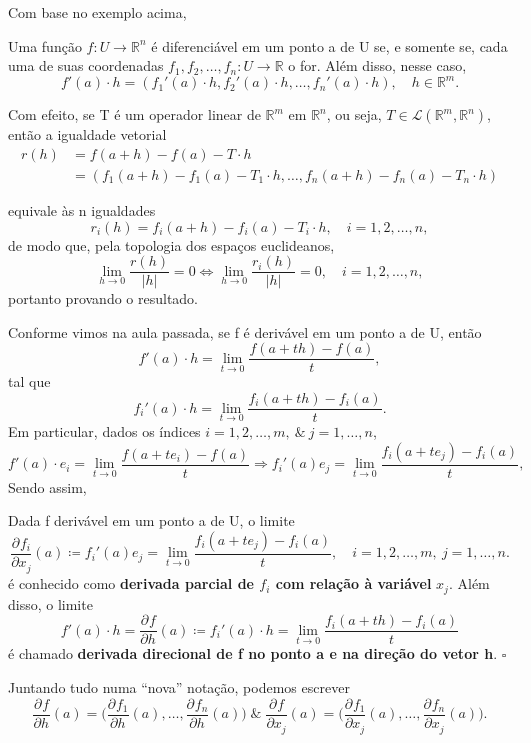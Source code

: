 \documentclass[../analysisII_notes.tex]{subfiles}
\begin{document}
Com base no exemplo acima,
\begin{prop*}
	Uma função \(f:U\rightarrow \mathbb{R}^{n}\) é diferenciável em um ponto a de U se, e somente se, cada uma de suas coordenadas \(f_1, f_2,\dotsc , f_{n}:U\rightarrow \mathbb{R}\) o for. Além disso, nesse caso,
	\[
		f'(a)\cdot h=(f_1'(a) \cdot h, f_2'(a) \cdot h, \dotsc, f_n'(a) \cdot h), \quad h\in \mathbb{R}^{m}.
	\]
\end{prop*}
\begin{proof*}
	Com efeito, se T é um operador linear de \(\mathbb{R}^{m}\) em \(\mathbb{R}^{n}\), ou seja, \(T\in \mathcal{L}(\mathbb{R}^{m}, \mathbb{R}^{n})\), então a igualdade vetorial
	\begin{align*}
		r(h) & =f(a+h)-f(a)-T \cdot h                                                \\
		     & = (f_1(a+h)-f_1(a)-T_1 \cdot h, \dotsc , f_n(a+h)-f_n(a)-T_n \cdot h)
	\end{align*}


	equivale às n igualdades
	\[
		r_{i}(h)=f_{i}(a+h)-f_{i}(a)-T_{i} \cdot h,\quad i=1, 2, \dotsc , n,
	\]
	de modo que, pela topologia dos espaços euclideanos,
	\[
		\lim_{h\to 0}\frac{r(h)}{|h|}= 0 \Longleftrightarrow \lim_{h\to 0}\frac{r_{i}(h)}{|h|}=0, \quad i=1, 2, \dotsc ,n,
	\]
	portanto provando o resultado. \qedsymbol
\end{proof*}
Conforme vimos na aula passada, se f é derivável em um ponto a de U, então
\[
	f'(a) \cdot h = \lim_{t\to 0}\frac{f(a+th)-f(a)}{t},
\]
tal que
\[
	f_{i}'(a)\cdot h=\lim_{t\to 0}\frac{f_{i}(a+th)-f_{i}(a)}{t}.
\]
Em particular, dados os índices \(i=1,2,\dotsc ,m,\:\&\: j=1,\dotsc ,n\),
\[
	f'(a)\cdot e_{i}=\lim_{t\to 0}\frac{f(a+te_{i})-f(a)}{t}\Rightarrow f_{i}'(a) e_{j}=\lim_{t\to 0}\frac{f_{i}(a+te_{j})-f_{i}(a)}{t},
\]
Sendo assim,
\begin{def*}
	Dada f derivável em um ponto a de U, o limite
	\[
		\frac{\partial^{}f_{i}}{\partial x_{j}^{}}(a)\coloneqq f_{i}'(a) e_{j}=\lim_{t\to 0}\frac{f_{i}(a+te_{j})-f_{i}(a)}{t},\quad i=1,2,\dotsc ,m,\: j=1,\dotsc ,n.
	\]
	é conhecido como \textbf{derivada parcial de \(f_{i}\) com relação à variável} \(x_{j}\). Além disso, o limite
	\[
		f'(a)\cdot h=\frac{\partial^{}f}{\partial h^{}}(a)\coloneqq f_{i}'(a)\cdot h=\lim_{t\to 0}\frac{f_{i}(a+th)-f_{i}(a)}{t}
	\]
	é chamado \textbf{derivada direcional de f no ponto a e na direção do vetor h}. \(\square\)
\end{def*}
Juntando tudo numa ``nova'' notação, podemos escrever
\[
	\frac{\partial^{}f}{\partial h^{}}(a)=\biggl(\frac{\partial^{}f_1}{\partial h^{}}(a), \dotsc , \frac{\partial^{}f_{n}}{\partial h^{}}(a) \biggr) \;\&\; \frac{\partial^{}f}{\partial x_{j}^{}}(a)=\biggl(\frac{\partial^{}f_{1}}{\partial x_{j}^{}}(a), \dotsc , \frac{\partial^{}f_{n}}{\partial x_{j}^{}}(a)\biggr).
\]
\end{document}
